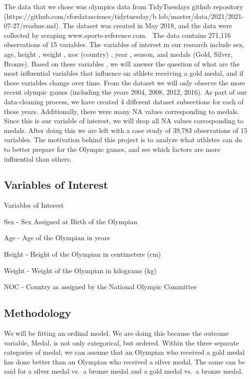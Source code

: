 \documentclass[
  letterpaper,
  DIV=11,
  numbers=noendperiod]{scrartcl}
\begin{document}
The data that we chose was olympics data from
TidyTuesday\textquotesingle s github repository
(https://github.com/rfordatascience/tidytuesday/b
lob/master/data/2021/2021-07-27/readme.md). The dataset was created in
May 2018, and the data were collected by scraping
www.sports-reference.com.~ The data contains 271,116 observations of 15
variables. The variables of interest in our research include sex, age,
height , weight , noc (country) , year , season, and medals (Gold,
Silver, Bronze). Based on these variables , we will answer the question
of what are the most influential variables that influence an athlete
receiving a gold medal, and if these variables change over time. From
the dataset we will only observe the more recent olympic games
(including the years 2004, 2008, 2012, 2016). As part of our
data-cleaning process, we have created 4 different dataset subsections
for each of these years. Additionally, there were many NA values
corresponding to medals. Since this is our variable of interest, we will
drop all NA values corresponding to medals. After doing this we are left
with a case study of 39,783 observations of 15 variables. The motivation
behind this project is to analyze what athletes can do to better prepare
for the Olympic games, and see which factors are more influential than
others.~

\hfill\break

\hypertarget{variables-of-interest}{%
\subsection{Variables of Interest}\label{variables-of-interest}}

Variables of Interest

Sex - Sex Assigned at Birth of the Olympian

Age - Age of the Olympian in years

Height - Height of the Olympian in centimeters (cm)

Weight - Weight of the Olympian in kilograms (kg)

NOC - Country as assigned by the National Olympic Committee

\hypertarget{methodology}{%
\subsection{Methodology}\label{methodology}}

We will be fitting an ordinal model. We are doing this because the
outcome variable, Medal, is not only categorical, but ordered. Within
the three separate categories of medal, we can assume that an Olympian
who received a gold medal has done better than an Olympian who received
a silver medal. The same can be said for a silver medal vs.~a bronze
medal and a gold medal vs.~a bronze medal.~
\end{document}
